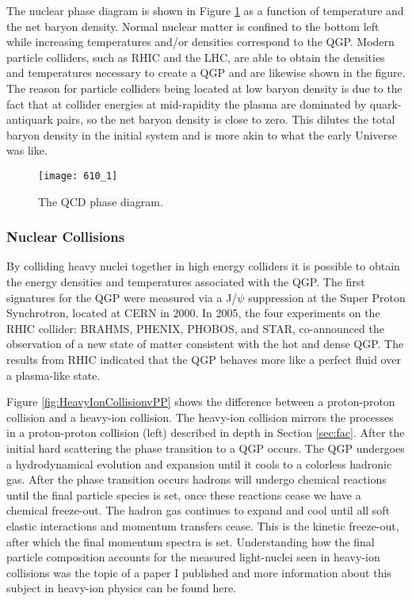 The nuclear phase diagram is shown in Figure \ref{fig:QCDphase} as a function of temperature and the net baryon density.  Normal nuclear matter is confined to the bottom left while increasing temperatures and/or densities correspond to the QGP.  Modern particle colliders, such as RHIC and the LHC, are able to obtain the densities and temperatures necessary to create a QGP and are likewise shown in the figure.  The reason for particle colliders being located at low baryon density is due to the fact that at collider energies at mid-rapidity the plasma are dominated by quark-antiquark pairs, so the net baryon density is close to zero.  This dilutes the total baryon density in the initial system and is more akin to what the early Universe was like.  

\begin{figure}[h]
\texttt{[image: 610\_1]}
\centering
\caption{The QCD phase diagram\cite{Mohanty:2013yca}.}
\label{fig:QCDphase}
\end{figure}

\subsubsection{Nuclear Collisions}
By colliding heavy nuclei together in high energy colliders it is possible to obtain the energy densities and temperatures associated with the QGP.  The first signatures for the QGP were measured via a J/$\psi$ suppression at the Super Proton Synchrotron, located at CERN in 2000\cite{Csorgo:2000yu}.  In 2005, the four experiments on the RHIC collider: BRAHMS\cite{Arsene:2004fa}, PHENIX\cite{Adcox2005184}, PHOBOS\cite{Back200528}, and STAR\cite{Adams2005102}, co-announced the observation of a new state of matter consistent with the hot and dense QGP.  The results from RHIC indicated that the QGP behaves more like a perfect fluid over a plasma-like state\cite{Jacak310}.

Figure \ref{fig:HeavyIonCollisionvPP} shows the difference between a proton-proton collision and a heavy-ion collision.  The heavy-ion collision mirrors the processes in a proton-proton collision (left) described in depth in Section \ref{sec:fac}.  After the initial hard scattering the phase transition to a QGP occurs.  The QGP undergoes a hydrodynamical evolution and expansion until it cools to a colorless hadronic gas.  After the phase transition occurs  hadrons will undergo chemical reactions until the final particle species is set, once these reactions cease we have a chemical freeze-out. The hadron gas continues to expand and cool until all soft elastic interactions and momentum transfers cease.  This is the kinetic freeze-out, after which the final momentum spectra is set.  Understanding how the final particle composition accounts for the measured light-nuclei seen in heavy-ion collisions was the topic of a paper I published and more information about this subject in heavy-ion physics can be found here\cite{Sharma:2018dyb}.

